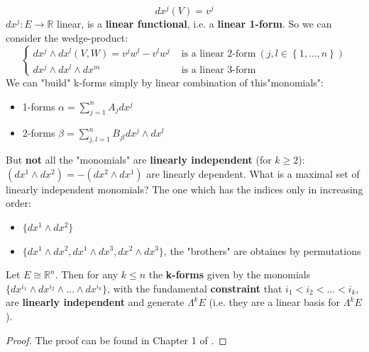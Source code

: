 \documentclass[../main.tex]{subfiles}
\begin{document}
\[
dx^j(V)=v^j
\]
$dx^j:E\to\mathbb{R}$ linear, is a \textbf{linear functional}, i.e. a \textbf{linear 1-form}. So we can consider the wedge-product:
\[
\left\{
\begin{split}
dx^j\wedge dx^l(V,W)=v^j w^l-v^l w^j &\text{ is a linear 2-form} \ \left(j,l\in\left\{1,\dots,n\right\}\right)\\
dx^j\wedge dx^l\wedge dx^m \qquad\qquad\qquad \ \ &\text{ is a linear 3-form}
\end{split}
\right.
\]
We can "build" k-forms simply by linear combination of this"monomials":
\begin{itemize}
    \item 1-forms $\alpha=\sum_{j=1}^n A_j dx^j$
    \item 2-forms $\beta=\sum_{j,l=1}^n B_{jl}dx^j\wedge dx^l$
\end{itemize}
{\selectfont{}\relax} But \textbf{not} all the "monomials" are \textbf{linearly independent} (for $k\ge2$): $(dx^1\wedge dx^2)=-(dx^2\wedge dx^1)$ are linearly dependent. What is a maximal set of linearly independent monomials? The one which has the indices only in increasing order:
\begin{itemize}
    \item $\{dx^1\wedge dx^2\}$
    \item $\{dx^1\wedge dx^2, dx^1\wedge dx^3, dx^2\wedge dx^3\}$, the "brothers" are obtaines by permutations
\end{itemize}
\begin{proposition}
Let $E\cong\mathbb{R}^n$. Then for any $k\le n$ the \textbf{k-forms} given by the monomials $\{dx^{i_1}\wedge dx^{i_2}\wedge\dots\wedge dx^{i_k}\}$, with the fundamental \textbf{constraint} that
$i_1<i_2<\dots<i_k$, are \textbf{linearly independent} and generate $\Lambda^k E$ (i.e. they are a linear basis for $\Lambda^k E$).
\end{proposition}
\begin{proof}
The proof can be found in Chapter 1 of \cite{doCarmo1994_1_diff_forms}.
\end{proof}
\end{document}
